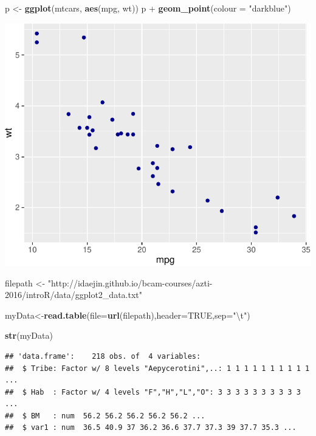 \documentclass[]{article}
\newenvironment{Shaded}{\begin{snugshade}}{\end{snugshade}}
\newcommand{\KeywordTok}[1]{\textcolor[rgb]{0.13,0.29,0.53}{\textbf{{#1}}}}
\newcommand{\DataTypeTok}[1]{\textcolor[rgb]{0.13,0.29,0.53}{{#1}}}
\newcommand{\CharTok}[1]{\textcolor[rgb]{0.31,0.60,0.02}{{#1}}}
\newcommand{\StringTok}[1]{\textcolor[rgb]{0.31,0.60,0.02}{{#1}}}
\newcommand{\OtherTok}[1]{\textcolor[rgb]{0.56,0.35,0.01}{{#1}}}
\newcommand{\NormalTok}[1]{{#1}}
\numberwithin{equation}{section}
\begin{document}
\begin{Shaded}
\begin{Highlighting}[]
\NormalTok{p <-}\StringTok{ }\KeywordTok{ggplot}\NormalTok{(mtcars, }\KeywordTok{aes}\NormalTok{(mpg, wt))}
\NormalTok{p +}\StringTok{ }\KeywordTok{geom_point}\NormalTok{(}\DataTypeTok{colour =} \StringTok{"darkblue"}\NormalTok{)}
\end{Highlighting}
\end{Shaded}

\includegraphics{index_files/figure-latex/unnamed-chunk-235-12.pdf}

\begin{Shaded}
\begin{Highlighting}[]
\NormalTok{filepath <-}\StringTok{ "http://idaejin.github.io/bcam-courses/azti-2016/introR/data/ggplot2_data.txt"}

\NormalTok{myData<-}\KeywordTok{read.table}\NormalTok{(}\DataTypeTok{file=}\KeywordTok{url}\NormalTok{(filepath),}\DataTypeTok{header=}\OtherTok{TRUE}\NormalTok{,}\DataTypeTok{sep=}\StringTok{"}\CharTok{\textbackslash{}t}\StringTok{"}\NormalTok{)}

\KeywordTok{str}\NormalTok{(myData)}
\end{Highlighting}
\end{Shaded}

\begin{verbatim}
## 'data.frame':    218 obs. of  4 variables:
##  $ Tribe: Factor w/ 8 levels "Aepycerotini",..: 1 1 1 1 1 1 1 1 1 1 ...
##  $ Hab  : Factor w/ 4 levels "F","H","L","O": 3 3 3 3 3 3 3 3 3 3 ...
##  $ BM   : num  56.2 56.2 56.2 56.2 56.2 ...
##  $ var1 : num  36.5 40.9 37 36.2 36.6 37.7 37.3 39 37.7 35.3 ...
\end{verbatim}
\end{document}
